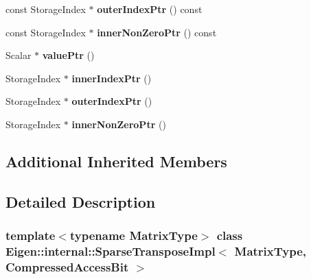 \begin{DoxyCompactItemize}
const Storage\+Index $\ast$ {\bfseries outer\+Index\+Ptr} () const
\item 
\mbox{\label{class_eigen_1_1internal_1_1_sparse_transpose_impl_3_01_matrix_type_00_01_compressed_access_bit_01_4_a69b6ed22e61847866b7d0d938f1067c8}} 
const Storage\+Index $\ast$ {\bfseries inner\+Non\+Zero\+Ptr} () const
\item 
\mbox{\label{class_eigen_1_1internal_1_1_sparse_transpose_impl_3_01_matrix_type_00_01_compressed_access_bit_01_4_a24754239717bc7c1a2c7846d8ce93884}} 
Scalar $\ast$ {\bfseries value\+Ptr} ()
\item 
\mbox{\label{class_eigen_1_1internal_1_1_sparse_transpose_impl_3_01_matrix_type_00_01_compressed_access_bit_01_4_ac0f0628eaedfd590e5c14771f6d46131}} 
Storage\+Index $\ast$ {\bfseries inner\+Index\+Ptr} ()
\item 
\mbox{\label{class_eigen_1_1internal_1_1_sparse_transpose_impl_3_01_matrix_type_00_01_compressed_access_bit_01_4_ad1b7889c71608d502c2effb9b171834d}} 
Storage\+Index $\ast$ {\bfseries outer\+Index\+Ptr} ()
\item 
\mbox{\label{class_eigen_1_1internal_1_1_sparse_transpose_impl_3_01_matrix_type_00_01_compressed_access_bit_01_4_ab5057fbf13b8241b6992de725c726e64}} 
Storage\+Index $\ast$ {\bfseries inner\+Non\+Zero\+Ptr} ()
\end{DoxyCompactItemize}
\subsection*{Additional Inherited Members}


\subsection{Detailed Description}
\subsubsection*{template$<$typename Matrix\+Type$>$\newline
class Eigen\+::internal\+::\+Sparse\+Transpose\+Impl$<$ Matrix\+Type, Compressed\+Access\+Bit $>$}



